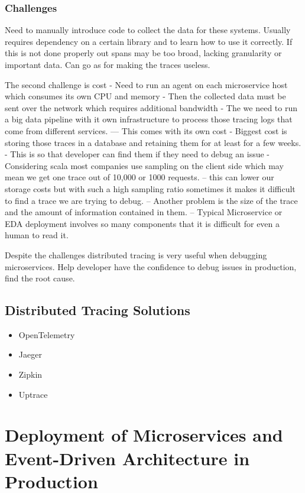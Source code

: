 \documentclass[a4paper, 11pt]{book}
\begin{document}
    \subsubsection{Challenges}
    Need to manually introduce code to collect the data for these systems.
    Usually requires dependency on a certain library and to learn how to use it correctly.
    If this is not done properly out spans may be too broad, lacking granularity or important data.
    Can go as for making the traces useless.

    The second challenge is cost
    - Need to run an agent on each microservice host which consumes its own CPU and memory
    - Then the collected data must be sent over the network which requires additional bandwidth
    - The we need to run a big data pipeline with it own infrastructure to process those tracing logs that come from different services.
    --- This comes with its own cost
    - Biggest cost is storing those traces in a database and retaining them for at least for a few weeks.
    - This is so that developer can find them if they need to debug an issue
    - Considering scala most companies use sampling on the client side which may mean we get one trace out of 10,000 or 1000 requests.
    -- this can lower our storage costs but with such a high sampling ratio sometimes it makes it difficult to find a trace we are trying to debug.
    -- Another problem is the size of the trace and the amount of information contained in them.
    -- Typical Microservice or EDA deployment involves so many components that it is difficult for even a human to read it.

    Despite the challenges distributed tracing is very useful when debugging microservices.
    Help developer have the confidence to debug issues in production, find the root cause.


    \subsection{Distributed Tracing Solutions}
    \begin{itemize}
        \item OpenTelemetry
        \item Jaeger
        \item Zipkin
        \item Uptrace
    \end{itemize}


    \section{Deployment of Microservices and Event-Driven Architecture in Production}
\end{document}
